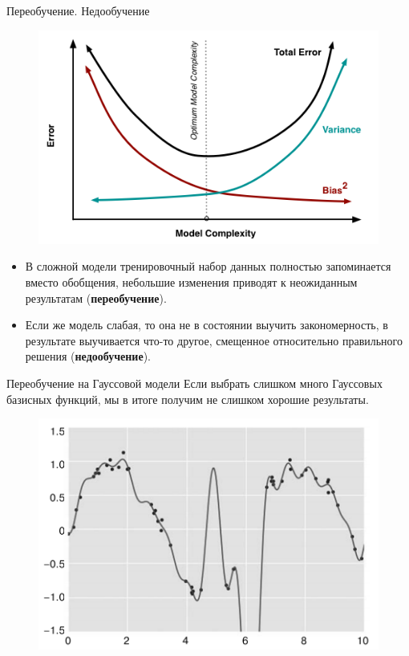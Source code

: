 \documentclass{beamer}
\begin{document}
\begin{frame}[fragile]{Переобучение. Недообучение}
\begin{figure}[h]
\centering
\includegraphics[scale=0.4]{images/complexity.png}
\end{figure}
\begin{itemize}
\item В сложной модели тренировочный набор данных полностью запоминается вместо обобщения, небольшие изменения приводят к неожиданным результатам (\textbf{переобучение}). 
\item Если же модель слабая, то она не в состоянии выучить закономерность, в результате выучивается что-то другое, смещенное относительно правильного решения (\textbf{недообучение}).
\end{itemize}
\end{frame}

\begin{frame}[fragile]{Переобучение на Гауссовой модели}
Если выбрать слишком много Гауссовых базисных функций, мы в итоге получим не слишком
хорошие результаты.
\begin{figure}[h]
\centering
\includegraphics[scale=0.75]{images/complex-02.png}
\end{figure}
\end{frame}
\end{document}
